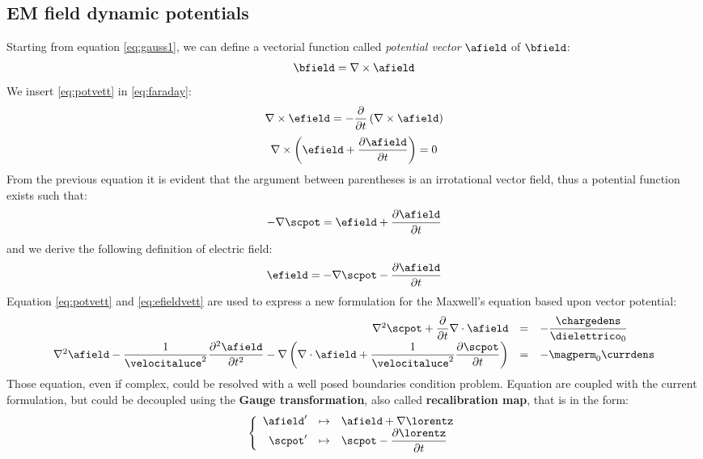 \subsection{EM field dynamic potentials}

Starting from equation \ref{eq:gauss1}, we can define a vectorial function called \emph{potential vector} $\afield$ of $\bfield$:
\begin{equation}
\bfield = \nabla\times\afield
\label{eq:potvett}
\end{equation}
We insert \ref{eq:potvett} in \ref{eq:faraday}:
\[
\nabla\times\efield = - \partialt \left( \nabla\times\afield \right)
\]
\begin{equation}
\nabla\times\left( \efield + \partialtarg{\afield} \right) = 0
\end{equation}
From the previous equation it is evident that the argument between parentheses is an irrotational vector field, thus a potential function exists such that:
\[
-\nabla\scpot = \efield + \partialtarg{\afield}
\]
and we derive the following definition of electric field:
\begin{equation}
\efield = - \nabla \scpot - \partialtarg{\afield}
\label{eq:efieldvett}
\end{equation}
Equation \ref{eq:potvett} and \ref{eq:efieldvett} are used to express a new formulation for the Maxwell's equation based upon vector potential:
\begin{equation}
\begin{array}{rcl}
\nabla^2\scpot + \partialt \nabla \cdot \afield & = & - \dfrac{\chargedens}{\dielettrico_0} \\
\nabla^2 \afield - \dfrac{1}{\velocitaluce^2} \partialttarg{\afield} - \nabla\left( \nabla \cdot \afield + \dfrac{1}{\velocitaluce^2} \partialtarg{\scpot} \right) & = & -\magperm_0 \currdens
\end{array}
\label{eq:potvecmaxwell}
\end{equation}
Those equation, even if complex, could be resolved with a well posed boundaries condition problem. Equation are coupled with the current formulation, but could be decoupled using the \textbf{Gauge transformation}\citep{mencuccini1988fisica}, also called \textbf{recalibration map}, that is in the form:
\begin{equation}
\left\{ \begin{array}{rcl}
\afield' & \mapsto & \afield + \nabla \lorentz \\
\scpot' & \mapsto & \scpot - \partialtarg{\lorentz}
\end{array}
\right.
\end{equation}
